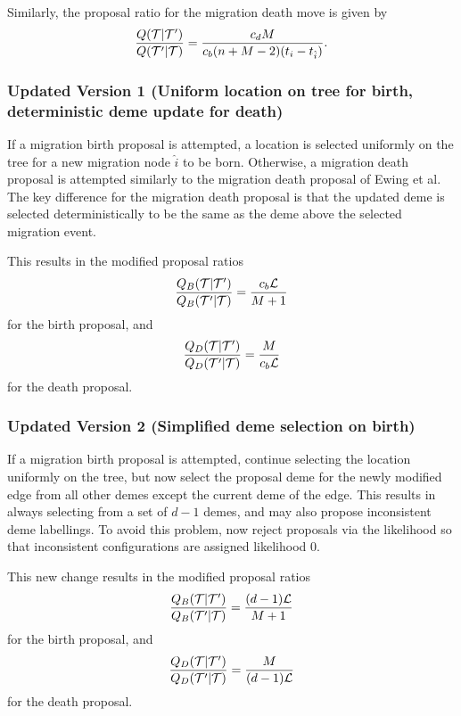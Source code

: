 Similarly, the proposal ratio for the migration death move is given by
\[
\frac{Q(\mathcal{T} | \mathcal{T}')}{Q(\mathcal{T}' | \mathcal{T})} = \frac{c_d M}{c_b (n+M - 2) (t_i -t_{\hat{i}})}.
\]

\subsubsection{Updated Version 1 (Uniform location on tree for birth, deterministic deme update for death)}
If a migration birth proposal is attempted, a location is selected uniformly on the tree for a new migration node $\hat{i}$ to be born. Otherwise, a migration death proposal is attempted similarly to the migration death proposal of Ewing et al. The key difference for the migration death proposal is that the updated deme is selected deterministically to be the same as the deme above the selected migration event.

This results in the modified proposal ratios
\[
\frac{Q_B(\mathcal{T} | \mathcal{T}')}{Q_B(\mathcal{T}' | \mathcal{T})} = \frac{c_b \mathcal{L}}{M+1}
\]
for the birth proposal, and
\[
\frac{Q_D(\mathcal{T} | \mathcal{T}')}{Q_D(\mathcal{T}' | \mathcal{T})} = \frac{M}{c_b \mathcal{L}}
\]
for the death proposal.

\subsubsection{Updated Version 2 (Simplified deme selection on birth)}
If a migration birth proposal is attempted, continue selecting the location uniformly on the tree, but now select the proposal deme for the newly modified edge from all other demes except the current deme of the edge. This results in always selecting from a set of $d-1$ demes, and may also propose inconsistent deme labellings. To avoid this problem, now reject proposals via the likelihood so that inconsistent configurations are assigned likelihood 0.

This new change results in the modified proposal ratios
\[
\frac{Q_B (\mathcal{T} | \mathcal{T}')}{Q_B (\mathcal{T}' | \mathcal{T})} = \frac{(d-1) \mathcal{L}}{M+1}
\]
for the birth proposal, and
\[
\frac{Q_D (\mathcal{T} | \mathcal{T}')}{Q_D (\mathcal{T}' | \mathcal{T})} = \frac{M}{(d-1)\mathcal{L}}
\]
for the death proposal.